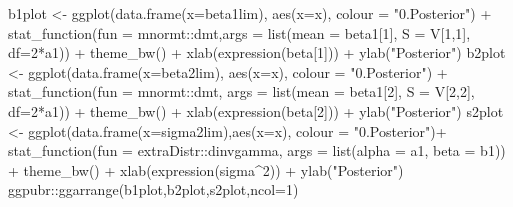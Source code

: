 \documentclass[
]{book}
\newenvironment{Shaded}{\begin{snugshade}}{\end{snugshade}}
\newcommand{\AttributeTok}[1]{\textcolor[rgb]{0.77,0.63,0.00}{#1}}
\newcommand{\DecValTok}[1]{\textcolor[rgb]{0.00,0.00,0.81}{#1}}
\newcommand{\FunctionTok}[1]{\textcolor[rgb]{0.00,0.00,0.00}{#1}}
\newcommand{\NormalTok}[1]{#1}
\newcommand{\OtherTok}[1]{\textcolor[rgb]{0.56,0.35,0.01}{#1}}
\newcommand{\SpecialCharTok}[1]{\textcolor[rgb]{0.00,0.00,0.00}{#1}}
\newcommand{\StringTok}[1]{\textcolor[rgb]{0.31,0.60,0.02}{#1}}
\begin{document}
\begin{Shaded}
\begin{Highlighting}[]
\NormalTok{b1plot }\OtherTok{\textless{}{-}} \FunctionTok{ggplot}\NormalTok{(}\FunctionTok{data.frame}\NormalTok{(}\AttributeTok{x=}\NormalTok{beta1lim), }\FunctionTok{aes}\NormalTok{(}\AttributeTok{x=}\NormalTok{x), }\AttributeTok{colour =} \StringTok{"0.Posterior"}\NormalTok{) }\SpecialCharTok{+}
  \FunctionTok{stat\_function}\NormalTok{(}\AttributeTok{fun =}\NormalTok{ mnormt}\SpecialCharTok{::}\NormalTok{dmt,}\AttributeTok{args =} \FunctionTok{list}\NormalTok{(}\AttributeTok{mean =}\NormalTok{ beta1[}\DecValTok{1}\NormalTok{], }\AttributeTok{S =}\NormalTok{ V[}\DecValTok{1}\NormalTok{,}\DecValTok{1}\NormalTok{], }\AttributeTok{df=}\DecValTok{2}\SpecialCharTok{*}\NormalTok{a1)) }\SpecialCharTok{+}
  \FunctionTok{theme\_bw}\NormalTok{() }\SpecialCharTok{+} \FunctionTok{xlab}\NormalTok{(}\FunctionTok{expression}\NormalTok{(beta[}\DecValTok{1}\NormalTok{])) }\SpecialCharTok{+} \FunctionTok{ylab}\NormalTok{(}\StringTok{"Posterior"}\NormalTok{)}
\NormalTok{b2plot }\OtherTok{\textless{}{-}} \FunctionTok{ggplot}\NormalTok{(}\FunctionTok{data.frame}\NormalTok{(}\AttributeTok{x=}\NormalTok{beta2lim), }\FunctionTok{aes}\NormalTok{(}\AttributeTok{x=}\NormalTok{x), }\AttributeTok{colour =} \StringTok{"0.Posterior"}\NormalTok{) }\SpecialCharTok{+}
  \FunctionTok{stat\_function}\NormalTok{(}\AttributeTok{fun =}\NormalTok{ mnormt}\SpecialCharTok{::}\NormalTok{dmt, }\AttributeTok{args =} \FunctionTok{list}\NormalTok{(}\AttributeTok{mean =}\NormalTok{ beta1[}\DecValTok{2}\NormalTok{], }\AttributeTok{S =}\NormalTok{ V[}\DecValTok{2}\NormalTok{,}\DecValTok{2}\NormalTok{], }\AttributeTok{df=}\DecValTok{2}\SpecialCharTok{*}\NormalTok{a1)) }\SpecialCharTok{+}
  \FunctionTok{theme\_bw}\NormalTok{() }\SpecialCharTok{+} \FunctionTok{xlab}\NormalTok{(}\FunctionTok{expression}\NormalTok{(beta[}\DecValTok{2}\NormalTok{])) }\SpecialCharTok{+} \FunctionTok{ylab}\NormalTok{(}\StringTok{"Posterior"}\NormalTok{)}
\NormalTok{s2plot }\OtherTok{\textless{}{-}} \FunctionTok{ggplot}\NormalTok{(}\FunctionTok{data.frame}\NormalTok{(}\AttributeTok{x=}\NormalTok{sigma2lim),}\FunctionTok{aes}\NormalTok{(}\AttributeTok{x=}\NormalTok{x), }\AttributeTok{colour =} \StringTok{"0.Posterior"}\NormalTok{)}\SpecialCharTok{+}
  \FunctionTok{stat\_function}\NormalTok{(}\AttributeTok{fun =}\NormalTok{ extraDistr}\SpecialCharTok{::}\NormalTok{dinvgamma, }\AttributeTok{args =} \FunctionTok{list}\NormalTok{(}\AttributeTok{alpha =}\NormalTok{ a1, }\AttributeTok{beta =}\NormalTok{ b1)) }\SpecialCharTok{+}
  \FunctionTok{theme\_bw}\NormalTok{() }\SpecialCharTok{+} \FunctionTok{xlab}\NormalTok{(}\FunctionTok{expression}\NormalTok{(sigma}\SpecialCharTok{\^{}}\DecValTok{2}\NormalTok{)) }\SpecialCharTok{+} \FunctionTok{ylab}\NormalTok{(}\StringTok{"Posterior"}\NormalTok{)}
\NormalTok{ggpubr}\SpecialCharTok{::}\FunctionTok{ggarrange}\NormalTok{(b1plot,b2plot,s2plot,}\AttributeTok{ncol=}\DecValTok{1}\NormalTok{)}
\end{Highlighting}
\end{Shaded}
\end{document}
